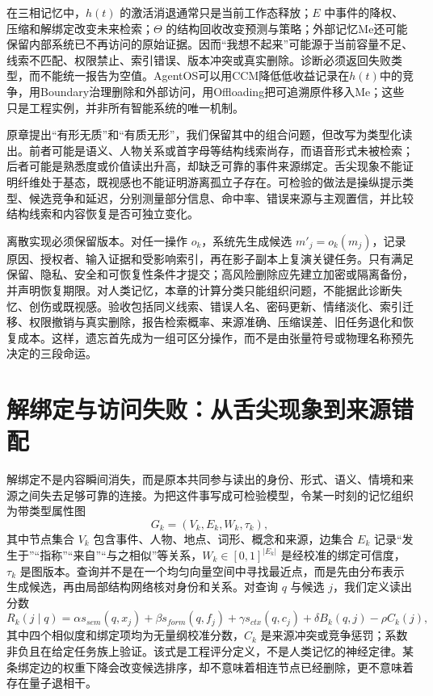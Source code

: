 在三相记忆中，$h(t)$ 的激活消退通常只是当前工作态释放；$E$ 中事件的降权、压缩和解绑定改变未来检索；$\Theta$ 的结构回收改变预测与策略；外部记忆Me还可能保留内部系统已不再访问的原始证据。因而“我想不起来”可能源于当前容量不足、线索不匹配、权限禁止、索引错误、版本冲突或真实删除。诊断必须返回失败类型，而不能统一报告为空值。AgentOS可以用CCM降低低收益记录在$h(t)$中的竞争，用Boundary治理删除和外部访问，用Offloading把可追溯原件移入Me；这些只是工程实例，并非所有智能系统的唯一机制。

原章提出“有形无质”和“有质无形”，我们保留其中的组合问题，但改写为类型化读出。前者可能是语义、人物关系或首字母等结构线索尚存，而语音形式未被检索；后者可能是熟悉度或价值读出升高，却缺乏可靠的事件来源绑定。舌尖现象不能证明纤维处于基态，既视感也不能证明游离孤立子存在。可检验的做法是操纵提示类型、候选竞争和延迟，分别测量部分信息、命中率、错误来源与主观置信，并比较结构线索和内容恢复是否可独立变化。

离散实现必须保留版本。对任一操作 $o_k$，系统先生成候选 $m'_j=o_k(m_j)$，记录原因、授权者、输入证据和受影响索引，再在影子副本上复演关键任务。只有满足保留、隐私、安全和可恢复性条件才提交；高风险删除应先建立加密或隔离备份，并声明恢复期限。对人类记忆，本章的计算分类只能组织问题，不能据此诊断失忆、创伤或既视感。验收包括同义线索、错误人名、密码更新、情绪淡化、索引迁移、权限撤销与真实删除，报告检索概率、来源准确、压缩误差、旧任务退化和恢复成本。这样，遗忘首先成为一组可区分操作，而不是由张量符号或物理名称预先决定的三段命运。

\section{解绑定与访问失败：从舌尖现象到来源错配}
\label{sec:decoupling_phase}
解绑定不是内容瞬间消失，而是原本共同参与读出的身份、形式、语义、情境和来源之间失去足够可靠的连接。为把这件事写成可检验模型，令某一时刻的记忆组织为带类型属性图
\[
G_k=(V_k,E_k,W_k,\tau_k),
\]
其中节点集合 $V_k$ 包含事件、人物、地点、词形、概念和来源，边集合 $E_k$ 记录“发生于”“指称”“来自”“与之相似”等关系，$W_k\in[0,1]^{|E_k|}$ 是经校准的绑定可信度，$\tau_k$ 是图版本。查询并不是在一个均匀向量空间中寻找最近点，而是先由分布表示生成候选，再由局部结构网络核对身份和关系。对查询 $q$ 与候选 $j$，我们定义读出分数
\[
R_k(j\mid q)=\alpha s_{sem}(q,x_j)+\beta s_{form}(q,f_j)+\gamma s_{ctx}(q,c_j)+\delta B_k(q,j)-\rho C_k(j),
\]
其中四个相似度和绑定项均为无量纲校准分数，$C_k$ 是来源冲突或竞争惩罚；系数非负且在给定任务族上验证。该式是工程评分定义，不是人类记忆的神经定律。某条绑定边的权重下降会改变候选排序，却不意味着相连节点已经删除，更不意味着存在量子退相干。

